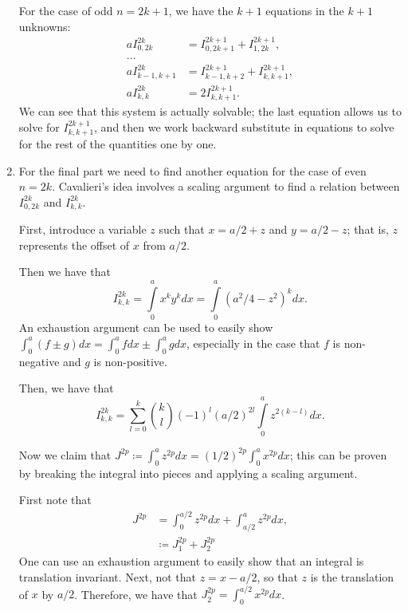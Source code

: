 \begin{enumerate}
For the case of odd \(n = 2k + 1\), we have the \(k+1\) equations in the \(k+1\) unknowns:
\begin{align}
a I^{2k}_{0, 2k} & = I^{2k+1}_{0, 2k+1} + I^{2k+1}_{1, 2k}, \\
... \\
a I^{2k}_{k-1, k+1} & = I^{2k+1}_{k-1, k+2} + I^{2k+1}_{k, k+1}, \\
a I^{2k}_{k, k} & = 2 I^{2k+1}_{k, k+1}.
\end{align}
We can see that this system is actually solvable; the last equation allows us to solve for \(I^{2k+1}_{k, k+1}\),
and then we work backward substitute in equations to solve for the rest of the quantities one by one. 

\item For the final part we need to find another equation for the case of even \(n = 2k\). Cavalieri's idea
involves a scaling argument to find a relation between \(I^{2k}_{0, 2k}\) and \(I^{2k}_{k, k}\). 

First, introduce a variable \(z\) such that \(x = a/2 + z\) and \(y = a/2 - z\); that is, \(z\) represents the
offset of \(x\) from \(a/2\).

Then we have that
\begin{equation}
I^{2k}_{k, k} = \int\limits_0^a x^k y^k dx = \int\limits_0^a (a^2/4 - z^2)^k dx.
\end{equation}
An exhaustion argument can be used to easily show \(\int_0^a (f \pm g) dx = \int_0^a f dx \pm \int_0^a g dx\),
especially in the case that \(f\) is non-negative and \(g\) is non-positive.

Then, we have that
\begin{equation}
I^{2k}_{k, k} = 
    \sum\limits_{l = 0}^{k} {k \choose l} (-1)^l (a/2)^{2l} \int\limits_0^a z^{2(k-l)} dx. 
\end{equation}

Now we claim that \(J^{2p} \coloneqq \int_0^a z^{2p} dx = (1/2)^{2p} \int_0^a x^{2p} dx\); this can be proven
by breaking the integral into pieces and applying a scaling argument. 

First note that
\begin{align}
J^{2p} & = \int_0^{a/2} z^{2p} dx + \int_{a/2}^a z^{2p} dx, \\ 
    & \coloneqq J^{2p}_1 + J^{2p}_2
\end{align}
One can use an exhaustion argument to easily show that an integral is translation invariant. Next,
not that \(z = x - a/2\), so that \(z\) is the translation of \(x\) by \(a/2\). Therefore, we have
that \(J^{2p}_2 = \int_0^{a/2} x^{2p} dx\).


\end{enumerate}
